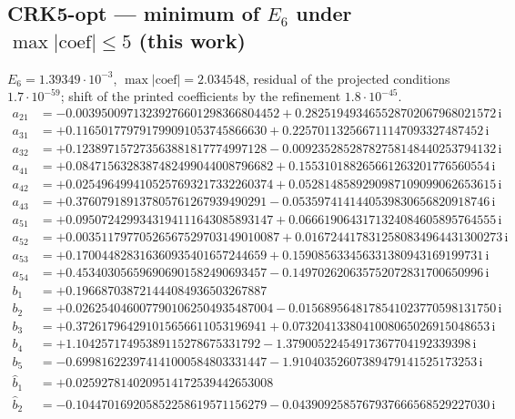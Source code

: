 \subsection*{CRK5-opt --- minimum of $E_6$ under $\max|\text{coef}|\le5$ (this work)}
$E_{6}=1.39349\cdot10^{-3}$, $\max|\text{coef}|=2.034548$, residual of the projected conditions $1.7\cdot10^{-59}$; shift of the printed coefficients by the refinement $1.8\cdot10^{-45}$. 
{\small
\begin{align*}
a_{21} &= -0.00395009713239276601298366804452 + 0.282519493465528702067968021572\,\mathrm{i}\\
a_{31} &= +0.116501779791799091053745866630 + 0.225701132566711147093327487452\,\mathrm{i}\\
a_{32} &= +0.123897157273563881817774997128 - 0.00923528528782758148440253794132\,\mathrm{i}\\
a_{41} &= +0.0847156328387482499044008796682 + 0.155310188265661263201776560554\,\mathrm{i}\\
a_{42} &= +0.0254964994105257693217332260374 + 0.0528148589290987109099062653615\,\mathrm{i}\\
a_{43} &= +0.376079189137805761267939490291 - 0.0535974141440539830656820918746\,\mathrm{i}\\
a_{51} &= +0.0950724299343194111643085893147 + 0.0666190643171324084605895764555\,\mathrm{i}\\
a_{52} &= +0.00351179770526567529703149010087 + 0.0167244178312580834964431300273\,\mathrm{i}\\
a_{53} &= +0.170044828316360935401657244659 + 0.159085633456331380943169199731\,\mathrm{i}\\
a_{54} &= +0.453403056596906901582490693457 - 0.149702620635752072831700650996\,\mathrm{i}\\[1mm]
b_{1} &= +0.196687038721444084936503267887\\
b_{2} &= +0.0262540460077901062504935487004 - 0.0156895648178541023770598131750\,\mathrm{i}\\
b_{3} &= +0.372617964291015656611053196941 + 0.0732041338041008065026915048653\,\mathrm{i}\\
b_{4} &= +1.10425717495389115278675331792 - 1.37900522454917367704192339398\,\mathrm{i}\\
b_{5} &= -0.699816223974141000584803331447 - 1.91040352607389479141525173253\,\mathrm{i}\\[1mm]
\hat b_{1} &= +0.0259278140209514172539442653008\\
\hat b_{2} &= -0.104470169205852258619571156279 - 0.0439092585767937666568529227030\,\mathrm{i}\\

\end{align*}}
